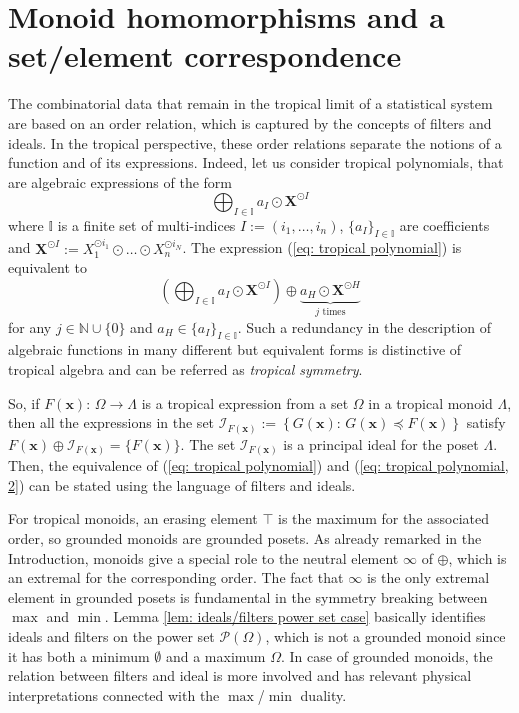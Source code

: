 \documentclass[11pt,british,reqno]{article}
\numberwithin{equation}{section}
\numberwithin{figure}{section}
\numberwithin{table}{section}
\theoremstyle{definition}
\theoremstyle{definition}
\theoremstyle{plain}
\theoremstyle{plain}
\theoremstyle{remark}
\theoremstyle{plain}
\numberwithin{equation}{section}
\numberwithin{figure}{section}
\numberwithin{table}{section}
\theoremstyle{plain}
\begin{document}
\section{\label{sec: Monoid homomorphisms and a set/element correspondence}
Monoid homomorphisms and a set/element correspondence}

The combinatorial data that remain in the tropical limit
of a statistical system are based on an order relation, which is captured by the concepts of filters and
ideals. In the tropical perspective, these order relations separate the notions of a 
function and of its expressions. Indeed, let us consider tropical
polynomials, that are algebraic expressions of the form 
\begin{equation}
\bigoplus_{I\in\mathbb{I}}a_{I}\odot\boldsymbol{X}^{\odot I}\label{eq: tropical polynomial}
\end{equation}
where $\mathbb{I}$ is a finite set of multi-indices $I:=(i_{1},\dots,i_{n})$,
$\{a_{I}\}_{I\in\mathbb{I}}$ are coefficients and $\boldsymbol{X}^{\odot I}:=X_{1}^{\odot i_{1}}\odot\dots\odot X_{n}^{\odot i_{N}}$.
The expression (\ref{eq: tropical polynomial}) is equivalent to 
\begin{equation}
{\displaystyle \left(\bigoplus_{I\in\mathbb{I}}a_{I}\odot\boldsymbol{X}^{\odot I}\right)\oplus\underset{{\scriptstyle j\mbox{ times}}}{\underbrace{a_{H}\odot\boldsymbol{X}^{\odot H}}}}\label{eq: tropical polynomial, 2}
\end{equation}
for any $j\in\mathbb{N\cup}\{0\}$ and $a_{H}\in\{a_{I}\}_{I\in\mathbb{I}}$.
Such a redundancy in the description of algebraic functions in many
different but equivalent forms is distinctive of tropical algebra
and can be referred as 	\emph{tropical symmetry}. 

So, if $F(\boldsymbol{x}):\,\Omega\longrightarrow\Lambda$ is a tropical
expression from a set $\Omega$ in a tropical monoid $\Lambda$, then
all the expressions in the set $\mathcal{I}_{F(\boldsymbol{x})}:=\left\{ G(\boldsymbol{x}):\,G(\boldsymbol{x})\preceq F(\boldsymbol{x})\right\} $
satisfy $F(\boldsymbol{x})\oplus\mathcal{I}_{F(\boldsymbol{x})}=\{F(\boldsymbol{x})\}$.
The set $\mathcal{I}_{F(\boldsymbol{x})}$ is a principal ideal for
the poset $\Lambda$. Then, the equivalence of (\ref{eq: tropical polynomial})
and (\ref{eq: tropical polynomial, 2}) can be stated using the language
of filters and ideals. 

For tropical monoids, an erasing element $\top$ is the maximum for
the associated order, so grounded monoids are grounded posets. As already remarked in the Introduction, monoids give a special role to the neutral element $\infty$ of $\oplus$, which is an extremal for the corresponding order. The
fact that $\infty$ is the only extremal element in grounded
posets is fundamental in the symmetry breaking between $\max$ and
$\min$. Lemma \ref{lem: ideals/filters power set case} basically
identifies ideals and filters on the power set $\mathcal{P}(\Omega)$,
which is not a grounded monoid since it has both a minimum $\emptyset$
and a maximum $\Omega$. In case of grounded monoids, the relation
between filters and ideal is more involved and has relevant physical
interpretations connected with the $\max$/$\min$ duality. 
\end{document}
